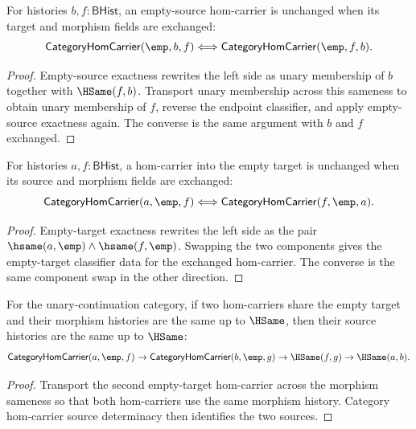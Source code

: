 \begin{theorem}
\label{thm:category-empty-source-target-morphism-swap}
For histories $b,f:\mathsf{BHist}$, an empty-source hom-carrier is unchanged
when its target and morphism fields are exchanged:
$$
\mathsf{CategoryHomCarrier}(\emp,b,f)
\Longleftrightarrow
\mathsf{CategoryHomCarrier}(\emp,f,b).
$$
\end{theorem}
\begin{proof}
Empty-source exactness rewrites the left side as unary membership of $b$
together with $\HSame(f,b)$. Transport unary membership across this sameness
to obtain unary membership of $f$, reverse the endpoint classifier, and apply
empty-source exactness again. The converse is the same argument with $b$ and
$f$ exchanged.
\end{proof}

\begin{theorem}
\label{thm:category-hom-carrier-empty-target-source-morphism-swap}
For histories $a,f:\mathsf{BHist}$, a hom-carrier into the empty target is
unchanged when its source and morphism fields are exchanged:
$$
\mathsf{CategoryHomCarrier}(a,\emp,f)
\Longleftrightarrow
\mathsf{CategoryHomCarrier}(f,\emp,a).
$$
\end{theorem}
\begin{proof}
Empty-target exactness rewrites the left side as the pair
$\hsame(a,\emp)\wedge\hsame(f,\emp)$. Swapping the two components gives the
empty-target classifier data for the exchanged hom-carrier. The converse is
the same component swap in the other direction.
\end{proof}

\begin{theorem}
\label{thm:category-empty-target-morphism-source-deterministic}
For the unary-continuation category, if two hom-carriers share the empty target
and their morphism histories are the same up to $\HSame$, then their source
histories are the same up to $\HSame$:
$$
\mathsf{CategoryHomCarrier}(a,\emp,f)\to
\mathsf{CategoryHomCarrier}(b,\emp,g)\to
\HSame(f,g)\to
\HSame(a,b).
$$
\end{theorem}
\begin{proof}
Transport the second empty-target hom-carrier across the morphism sameness so
that both hom-carriers use the same morphism history. Category hom-carrier
source determinacy then identifies the two sources.
\end{proof}

